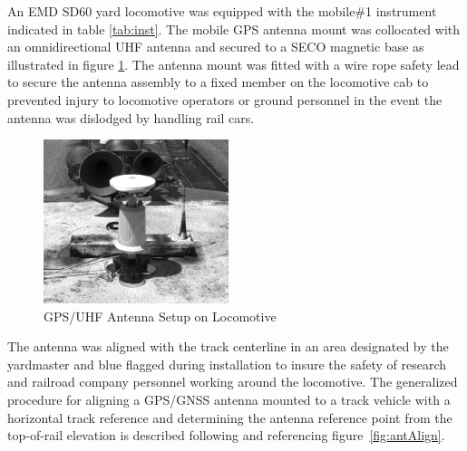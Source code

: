 An EMD SD60 yard locomotive was equipped with the mobile\#1 instrument indicated in table \ref{tab:inst}. The mobile GPS antenna mount was collocated with an omnidirectional UHF antenna and secured to a SECO magnetic base as illustrated in figure \ref{fig:locoAnt}. The antenna mount was fitted with a wire rope safety lead to secure the antenna assembly to a fixed member on the locomotive cab to prevented injury to locomotive operators or ground personnel in the event the antenna was dislodged by handling rail cars. 
\begin{figure}[h!]
  \begin{center}
    \includegraphics[width=0.48\textwidth]{graphics/AntennaMountBWcrop}
  \end{center}
  \caption{GPS/UHF Antenna Setup on Locomotive}
  \label{fig:locoAnt}

\end{figure}
The antenna was aligned with the track centerline in an area designated by the yardmaster and blue flagged during installation to insure the safety of research and railroad company personnel working around the locomotive. The generalized procedure for aligning a GPS/GNSS antenna mounted to a track vehicle with a horizontal track reference and determining the antenna reference point from the top-of-rail elevation is described following and referencing figure~\ref{fig:antAlign}.

